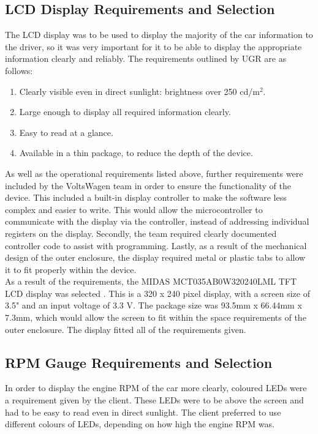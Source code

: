 \documentclass[a4paper,12pt]{article}
\begin{document}
\subsection{LCD Display Requirements and Selection}
\label{sec:display}

The LCD display was to be used to display the majority of the car information to the driver, so it was very important for it to be able to display the appropriate information clearly and reliably. The requirements outlined by UGR are as follows:

\begin{enumerate}
  \item Clearly visible even in direct sunlight: brightness over 250 cd/$\textrm{m}^2$.
  \item Large enough to display all required information clearly.
  \item Easy to read at a glance.
  \item Available in a thin package, to reduce the depth of the device.
\end{enumerate}

As well as the operational requirements listed above, further requirements were included by the VoltsWagen team in order to ensure the functionality of the device. This included a built-in display controller to make the software less complex and easier to write. This would allow the microcontroller to communicate with the display via the controller, instead of addressing individual registers on the display. Secondly, the team required clearly documented controller code to assist with programming. Lastly, as a result of the mechanical design of the outer enclosure, the display required metal or plastic tabs to allow it to fit properly within the device. \\

As a result of the requirements, the MIDAS MCT035AB0W320240LML TFT LCD display was selected \cite{display_datasheet}. This is a 320 x 240 pixel display, with a screen size of 3.5" and an input voltage of 3.3 V. The package size was 93.5mm x 66.44mm x 7.3mm, which would allow the screen to fit within the space requirements of the outer enclosure. The display fitted all of the requirements given.

\subsection{RPM Gauge Requirements and Selection}
\label{sec:LEDs}

In order to display the engine RPM of the car more clearly, coloured LEDs were a requirement given by the client. These LEDs were to be above the screen and had to be easy to read even in direct sunlight. The client preferred to use different colours of LEDs, depending on how high the engine RPM was. \\
\end{document}

